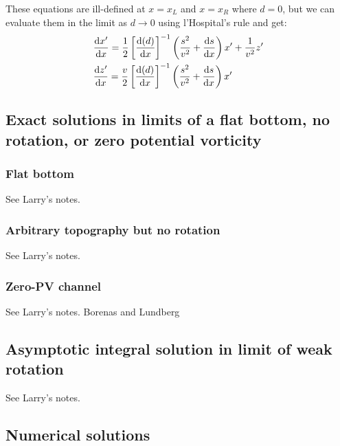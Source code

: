 \documentclass{jfm}
\begin{document}
These equations are ill-defined at $x=x_{L}$ and $x=x_{R}$ where $d=0$, but we can evaluate them in the limit as $d\rightarrow 0$ using l'Hospital's rule and get:
\begin{align}
& \dv{x'}{x} = \frac{1}{2} \left[ \dv{(d)}{x} \right]^{-1} \left( \frac{s^{2}}{v^{2}} + \dv{s}{x} \right) x' + \frac{1}{v^{2}}z'\label{finitediff1} \\
& \dv{z'}{x} = \frac{v}{2} \left[ \dv{(d)}{x} \right]^{-1} \left( \frac{s^{2}}{v^{2}} + \dv{s}{x} \right) x'\label{finitediff2}
\end{align}


\subsection{Exact solutions in limits of a flat bottom, no rotation, or zero potential vorticity}

\subsubsection{Flat bottom}

See Larry's notes.

\subsubsection{Arbitrary topography but no rotation}

See Larry's notes.

\subsubsection{Zero-PV channel}

See Larry's notes. Borenas and Lundberg

\subsection{Asymptotic integral solution in limit of weak rotation}

See Larry's notes.

\subsection{Numerical solutions}
\end{document}
